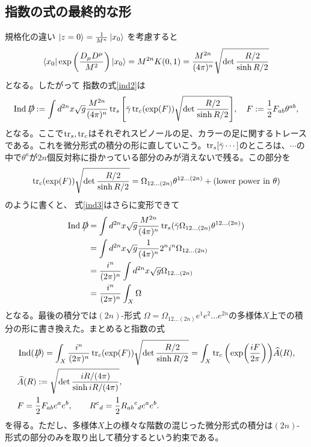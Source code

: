 \documentclass[12pt,a4paper]{jlreq}
\DeclareMathOperator*{\Ind}{\mathrm{Ind}}
\newcommand{\gammab}{\bar{\gamma}}
\newcommand{\Dsla}{D\hspace{-0.65em}\big/}
\begin{document}
\subsection*{指数の式の最終的な形}
規格化の違い $\ket{z=0}=\frac{1}{M^n}\ket{x_0}$ を考慮すると
\begin{align*}
  \bra{x_0}\exp\left(\frac{D_{\mu}D^{\mu}}{M^2}\right)\ket{x_0}=
  M^{2n} K(0,1)=\frac{M^{2n}}{(4\pi)^n}
  \sqrt{\det\frac{R/2}{\sinh R/2}}
\end{align*}
となる。したがって
指数の式\eqref{ind2}は
\begin{align}
  \Ind{\Dsla}:=\int d^{2n}x \sqrt{g}\frac{M^{2n}}{(4\pi)^n}\tr_{s}\qty[\gammab
    \tr_{c}(\exp(F))\sqrt{\det\frac{R/2}{\sinh R/2}}],\quad
  F:=\frac12 F_{ab}\theta^{ab},
  \label{ind3}
\end{align}
となる。ここで$\tr_s,\tr_c$はそれぞれスピノールの足、カラーの足に関するトレースである。これを微分形式の積分の形に直していこう。$\tr_s[\gammab \cdots]$のところは、$\cdots$の中で$\theta^{a}$が$2n$個反対称に掛かっている部分のみが消えないで残る。この部分を
\begin{align}
  \tr_{c}(\exp(F))\sqrt{\det\frac{R/2}{\sinh R/2}}
  =\Omega_{12\dots(2n)}\theta^{12\dots(2n)}+(\text{lower power in }\theta)
\end{align}
のように書くと、
式\eqref{ind3}はさらに変形できて
\begin{align}
  \Ind{\Dsla}
   & =\int d^{2n}x \sqrt{g}\frac{M^{2n}}{(4\pi)^n}\tr_{s}(\gammab \Omega_{12\dots(2n)}\theta^{12\dots(2n)}) \\
   & =\int d^{2n}x \sqrt{g}\frac{1}{(4\pi)^n}2^n i^n\Omega_{12\dots(2n)}                                    \\
   & =\frac{i^n}{(2\pi)^n}\int d^{2n}x \sqrt{g}\Omega_{12\dots(2n)}                                         \\
  &=\frac{i^n}{(2\pi)^n} \int_{X} \Omega
\end{align}
となる。最後の積分では$(2n)$-形式 $\Omega=\Omega_{12\dots(2n)}e^1e^2\dots e^{2n}$の多様体$X$上での積分の形に書き換えた。まとめると指数の式
\begin{align}
   & \Ind(\Dsla)
  =\int_{X} \frac{i^n}{(2\pi)^n}\tr_{c}(\exp(F))\sqrt{\det\frac{R/2}{\sinh R/2}}
  =\int_{X} \tr_{c}\qty(\exp(\frac{iF}{2\pi}))\widehat{A}(R),                          \\
   & \widehat{A}(R):=\sqrt{\det\frac{iR/(4\pi)}{\sinh iR/(4\pi)}},                 \\
   & F=\frac12 F_{ab}e^a e^b,\qquad R^{c}{}_{d}=\frac12 R_{ab}{}^{c}{}_{d}e^a e^b.
\end{align}
を得る。ただし、多様体$X$上の様々な階数の混じった微分形式の積分は$(2n)$-形式の部分のみを取り出して積分するという約束である。
\end{document}

